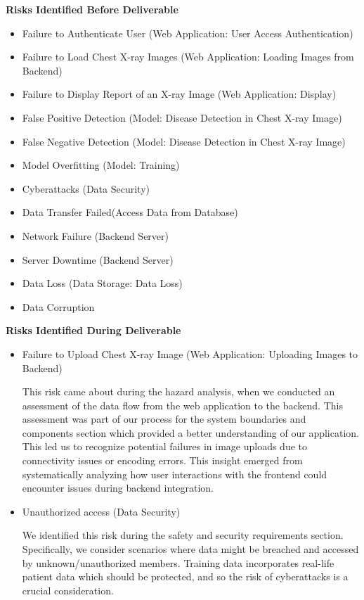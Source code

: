 \documentclass{article}
\begin{document}
\begin{enumerate}
    \textbf{Risks Identified Before Deliverable}
    \begin{itemize}
      \item Failure to Authenticate User (Web Application: User Access Authentication)
      \item Failure to Load Chest X-ray Images (Web Application: Loading Images from Backend)
      \item Failure to Display Report of an X-ray Image (Web Application: Display)
      \item False Positive Detection (Model: Disease Detection in Chest X-ray Image)
      \item False Negative Detection (Model: Disease Detection in Chest X-ray Image)
      \item Model Overfitting (Model: Training)
      \item Cyberattacks (Data Security)
      \item Data Transfer Failed(Access Data from Database)
      \item Network Failure (Backend Server)
      \item Server Downtime (Backend Server)
      \item Data Loss (Data Storage: Data Loss)
      \item Data Corruption
    \end{itemize}

    \textbf{Risks Identified During Deliverable}
    \begin{itemize}
      \item Failure to Upload Chest X-ray Image (Web Application: Uploading Images to Backend)

        This risk came about during the hazard analysis, when we conducted an assessment of the 
        data flow from the web application to the backend. This assessment was part of our process 
        for the system boundaries and components section which provided a better understanding of 
        our application. This led us to recognize potential failures in image uploads due to
        connectivity issues or encoding errors. This insight emerged from systematically analyzing
        how user interactions with the frontend could encounter issues during backend integration.

      \item Unauthorized access (Data Security)

        We identified this risk during the safety and security requirements section. Specifically,
        we consider scenarios where data might be breached and accessed by unknown/unauthorized
        members. Training data incorporates real-life patient data which should be protected, and 
        so the risk of cyberattacks is a crucial consideration.


\end{itemize}
\end{enumerate}
\end{document}
